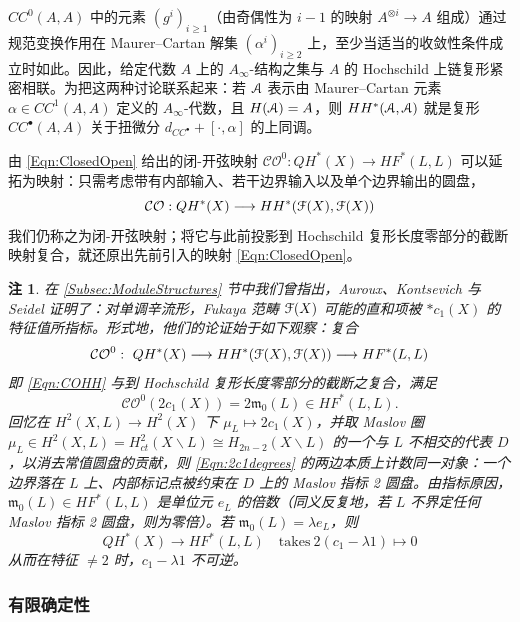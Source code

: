 \documentclass[11pt,a4paper]{article}
\numberwithin{equation}{section}
\newtheorem{Remark}[thm]{注}
\newcommand{\scrA}{\EuScript{A}}
\newcommand{\scrF}{\EuScript{F}}
\providecommand{\frak}[1]{\mathfrak{#1}}
\begin{document}
$CC^0(A,A)$ 中的元素 $(g^i)_{i\geq 1}$（由奇偶性为 $i-1$ 的映射 $A^{\otimes i} \rightarrow A$ 组成）通过规范变换作用在 Maurer--Cartan 解集 $(\alpha^i)_{i\geq 2}$ 上，至少当适当的收敛性条件成立时如此。因此，给定代数 $A$ 上的 $A_{\infty}$-结构之集与 $A$ 的 Hochschild 上链复形紧密相联。为把这两种讨论联系起来：若 $\scrA$ 表示由 Maurer--Cartan 元素 $\alpha \in CC^1(A,A)$ 定义的 $A_{\infty}$-代数，且 $H(\scrA) = A$，则 $HH^*(\scrA,\scrA)$ 就是复形 $CC^{\bullet}(A,A)$ 关于扭微分 $d_{CC^{\bullet}} + [\cdot, \alpha]$ 的上同调。

由 \eqref{Eqn:ClosedOpen} 给出的闭-开弦映射 $\mathcal{CO}^0: QH^*(X) \rightarrow HF^*(L,L)$ 可以延拓为映射：只需考虑带有内部输入、若干边界输入以及单个边界输出的圆盘，
\begin{equation} \label{Eqn:COHH}
\mathcal{CO}: QH^*(X) \longrightarrow HH^*(\scrF(X), \scrF(X))
\end{equation}
我们仍称之为闭-开弦映射；将它与此前投影到 Hochschild 复形长度零部分的截断映射复合，就还原出先前引入的映射 \eqref{Eqn:ClosedOpen}。

\begin{Remark}\label{Rem:StarC1}
在 \ref{Subsec:ModuleStructures} 节中我们曾指出，Auroux、Kontsevich 与 Seidel 证明了：对单调辛流形，Fukaya 范畴 $\scrF(X)$ 可能的直和项被 $\ast c_1(X)$ 的特征值所指标。形式地，他们的论证始于如下观察：复合
\[
\mathcal{CO}^0: \ QH^*(X) \longrightarrow HH^*(\scrF(X), \scrF(X)) \longrightarrow HF^*(L,L)
\]
即 \eqref{Eqn:COHH} 与到 Hochschild 复形长度零部分的截断之复合，满足
\begin{equation} \label{Eqn:2c1degrees}
\mathcal{CO}^0(2c_1(X)) = 2 \frak{m}_0(L) \in HF^*(L,L).
\end{equation}
回忆在 $H^2(X,L) \rightarrow H^2(X)$ 下 $\mu_L \mapsto 2c_1(X)$，并取 Maslov 圈 $\mu_L \in H^2(X,L) = H^2_{ct}(X\backslash L)  \cong H_{2n-2}(X\backslash L)$ 的一个与 $L$ 不相交的代表 $D$，以消去常值圆盘的贡献，则 \eqref{Eqn:2c1degrees} 的两边本质上计数同一对象：一个边界落在 $L$ 上、内部标记点被约束在 $D$ 上的 Maslov 指标 2 圆盘。由指标原因，$\frak{m}_0(L) \in HF^*(L,L)$ 是单位元 $e_L$ 的倍数（同义反复地，若 $L$ 不界定任何 Maslov 指标 2 圆盘，则为零倍）。若 $\frak{m}_0(L) = \lambda e_L$，则
\[
QH^*(X) \rightarrow HF^*(L,L) \quad \mathrm{takes} \ 2(c_1-\lambda 1) \mapsto 0
\]
从而在特征 $\neq 2$ 时，$c_1-\lambda 1$ 不可逆。
\end{Remark}

\subsubsection{有限确定性\label{Subsec:FiniteDeterminacy}}
\end{document}
